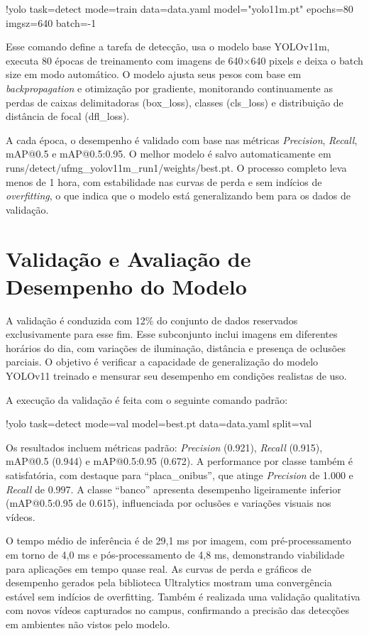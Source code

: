 !yolo task=detect mode=train data=data.yaml model="yolo11m.pt" epochs=80\\imgsz=640 batch=-1

Esse comando define a tarefa de detecção, usa o modelo base YOLOv11m, executa 80 épocas de treinamento com imagens de 640×640 pixels e deixa o batch size em modo automático. O modelo ajusta seus pesos com base em \textit{backpropagation} e otimização por gradiente, monitorando continuamente as perdas de caixas delimitadoras (box\_loss), classes (cls\_loss) e distribuição de distância de focal (dfl\_loss).

A cada época, o desempenho é validado com base nas métricas \textit{Precision}, \textit{Recall}, mAP@0.5 e mAP@0.5:0.95. O melhor modelo é salvo automaticamente em runs/detect/ufmg\_yolov11m\_run1/weights/best.pt. O processo completo leva menos de 1 hora, com estabilidade nas curvas de perda e sem indícios de \textit{overfitting}, o que indica que o modelo está generalizando bem para os dados de validação.

\section{Validação e Avaliação de Desempenho do Modelo}

A validação é conduzida com 12\% do conjunto de dados reservados exclusivamente para esse fim. Esse subconjunto inclui imagens em diferentes horários do dia, com variações de iluminação, distância e presença de oclusões parciais. O objetivo é verificar a capacidade de generalização do modelo YOLOv11 treinado e mensurar seu desempenho em condições realistas de uso.

A execução da validação é feita com o seguinte comando padrão:

!yolo task=detect mode=val model=best.pt data=data.yaml split=val

Os resultados incluem métricas padrão: \textit{Precision} (0.921), \textit{Recall} (0.915), mAP@0.5 (0.944) e mAP@0.5:0.95 (0.672). A performance por classe também é satisfatória, com destaque para “placa\_onibus”, que atinge \textit{Precision} de 1.000 e \textit{Recall} de 0.997. A classe “banco” apresenta desempenho ligeiramente inferior (mAP@0.5:0.95 de 0.615), influenciada por oclusões e variações visuais nos vídeos.

O tempo médio de inferência é de 29,1 ms por imagem, com pré-processamento em torno de 4,0 ms e pós-processamento de 4,8 ms, demonstrando viabilidade para aplicações em tempo quase real. As curvas de perda e gráficos de desempenho gerados pela biblioteca Ultralytics mostram uma convergência estável sem indícios de overfitting. Também é realizada uma validação qualitativa com novos vídeos capturados no campus, confirmando a precisão das detecções em ambientes não vistos pelo modelo.

